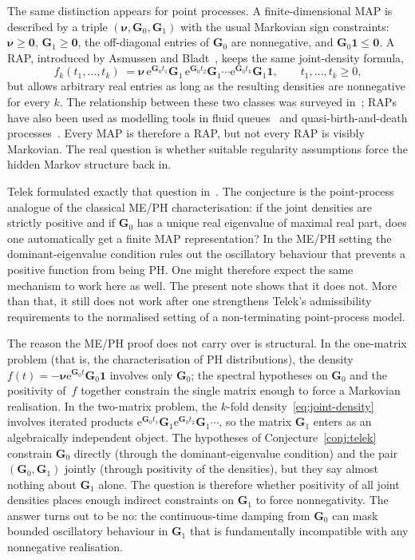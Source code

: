 \documentclass[11pt]{article}
\theoremstyle{definition}
\theoremstyle{remark}
\newcommand{\e}{\mathrm{e}}
\newcommand{\bzero}{\bm{0}}
\begin{document}
The same distinction appears for point processes.
A finite-dimensional MAP is described by a triple $(\bm{\nu},\bm{G}_0,\bm{G}_1)$ with the usual Markovian sign constraints: $\bm{\nu}\ge\bzero$, $\bm{G}_1\ge\bzero$, the off-diagonal entries of $\bm{G}_0$ are nonnegative, and $\bm{G}_0\bm{1}\le\bzero$.
A RAP, introduced by Asmussen and Bladt~\cite{AsmussenBladt1999}, keeps the same joint-density formula,
\begin{equation}\label{eq:joint-density}
f_k(t_1,\dots,t_k)
\;=
\bm{\nu}\,\e^{\bm{G}_0 t_1}\bm{G}_1\,\e^{\bm{G}_0 t_2}\bm{G}_1\cdots \e^{\bm{G}_0 t_k}\bm{G}_1\bm{1},
\qquad t_1,\dots,t_k\ge 0,
\end{equation}
but allows arbitrary real entries as long as the resulting densities are nonnegative for every $k$.
The relationship between these two classes was surveyed in~\cite{asmussen2022ph}; RAPs have also been used as modelling tools in fluid queues~\cite{bean2022rap} and quasi-birth-and-death processes~\cite{bean2010quasi}.
Every MAP is therefore a RAP, but not every RAP is visibly Markovian.
The real question is whether suitable regularity assumptions force the hidden Markov structure back in.

Telek formulated exactly that question in~\cite{Telek2022}. The conjecture is the point-process analogue of the classical ME/PH characterisation: if the joint densities are strictly positive and if $\bm{G}_0$ has a unique real eigenvalue of maximal real part, does one automatically get a finite MAP representation? In the ME/PH setting the dominant-eigenvalue condition rules out the oscillatory behaviour that prevents a positive function from being PH. One might therefore expect the same mechanism to work here as well. The present note shows that it does not. More than that, it still does not work after one strengthens Telek's admissibility requirements to the normalised setting of a non-terminating point-process model.

The reason the ME/PH proof does not carry over is structural. In the one-matrix problem (that is, the characterisation of PH distributions), the density $f(t)=-\bm{\nu}\e^{\bm{G}_0t}\bm{G}_0\bm{1}$ involves only $\bm{G}_0$; the spectral hypotheses on $\bm{G}_0$ and the positivity of~$f$ together constrain the single matrix enough to force a Markovian realisation. In the two-matrix problem, the $k$-fold density~\eqref{eq:joint-density} involves iterated products $\e^{\bm{G}_0t_1}\bm{G}_1\e^{\bm{G}_0t_2}\bm{G}_1\cdots$, so the matrix $\bm{G}_1$ enters as an algebraically independent object. The hypotheses of Conjecture~\ref{conj:telek} constrain $\bm{G}_0$ directly (through the dominant-eigenvalue condition) and the pair $(\bm{G}_0,\bm{G}_1)$ jointly (through positivity of the densities), but they say almost nothing about $\bm{G}_1$ alone. The question is therefore whether positivity of all joint densities places enough indirect constraints on $\bm{G}_1$ to force nonnegativity. The answer turns out to be no: the continuous-time damping from $\bm{G}_0$ can mask bounded oscillatory behaviour in $\bm{G}_1$ that is fundamentally incompatible with any nonnegative realisation.
\end{document}
